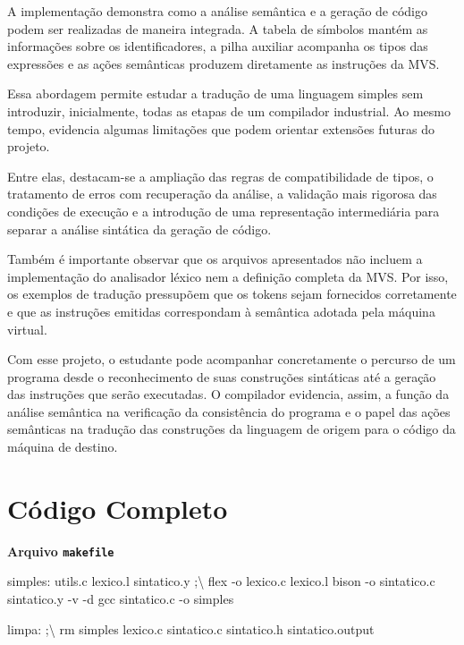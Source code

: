 \documentclass[
  brazilian,
  letterpaper,
]{book}
\newenvironment{Shaded}{\begin{snugshade}}{\end{snugshade}}
\newcommand{\NormalTok}[1]{\textcolor[rgb]{0.00,0.23,0.31}{#1}}
\newcommand{\OperatorTok}[1]{\textcolor[rgb]{0.37,0.37,0.37}{#1}}
\theoremstyle{plain}
\theoremstyle{definition}
\theoremstyle{remark}
\begin{document}
A implementação demonstra como a análise semântica e a geração de código
podem ser realizadas de maneira integrada. A tabela de símbolos mantém
as informações sobre os identificadores, a pilha auxiliar acompanha os
tipos das expressões e as ações semânticas produzem diretamente as
instruções da MVS.

Essa abordagem permite estudar a tradução de uma linguagem simples sem
introduzir, inicialmente, todas as etapas de um compilador industrial.
Ao mesmo tempo, evidencia algumas limitações que podem orientar
extensões futuras do projeto.

Entre elas, destacam-se a ampliação das regras de compatibilidade de
tipos, o tratamento de erros com recuperação da análise, a validação
mais rigorosa das condições de execução e a introdução de uma
representação intermediária para separar a análise sintática da geração
de código.

Também é importante observar que os arquivos apresentados não incluem a
implementação do analisador léxico nem a definição completa da MVS. Por
isso, os exemplos de tradução pressupõem que os tokens sejam fornecidos
corretamente e que as instruções emitidas correspondam à semântica
adotada pela máquina virtual.

Com esse projeto, o estudante pode acompanhar concretamente o percurso
de um programa desde o reconhecimento de suas construções sintáticas até
a geração das instruções que serão executadas. O compilador evidencia,
assim, a função da análise semântica na verificação da consistência do
programa e o papel das ações semânticas na tradução das construções da
linguagem de origem para o código da máquina de destino.

\section{Código Completo}\label{cuxf3digo-completo}

\textbf{Arquivo \texttt{makefile}}

\begin{Shaded}
\begin{Highlighting}[]
\NormalTok{simples}\OperatorTok{:}\NormalTok{ utils}\OperatorTok{.}\NormalTok{c lexico}\OperatorTok{.}\NormalTok{l sintatico}\OperatorTok{.}\NormalTok{y }\OperatorTok{;}\NormalTok{\textbackslash{}}
\NormalTok{    flex }\OperatorTok{{-}}\NormalTok{o lexico}\OperatorTok{.}\NormalTok{c lexico}\OperatorTok{.}\NormalTok{l}
\NormalTok{    bison }\OperatorTok{{-}}\NormalTok{o sintatico}\OperatorTok{.}\NormalTok{c sintatico}\OperatorTok{.}\NormalTok{y }\OperatorTok{{-}}\NormalTok{v }\OperatorTok{{-}}\NormalTok{d}
\NormalTok{    gcc sintatico}\OperatorTok{.}\NormalTok{c }\OperatorTok{{-}}\NormalTok{o simples}

\NormalTok{limpa}\OperatorTok{:} \OperatorTok{;}\NormalTok{\textbackslash{}}
\NormalTok{    rm simples lexico}\OperatorTok{.}\NormalTok{c sintatico}\OperatorTok{.}\NormalTok{c sintatico}\OperatorTok{.}\NormalTok{h sintatico}\OperatorTok{.}\NormalTok{output}
\end{Highlighting}
\end{Shaded}
\end{document}
